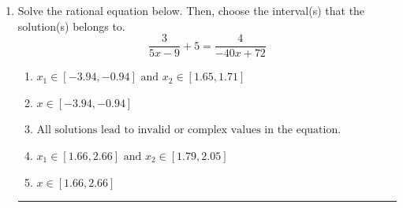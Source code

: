 \documentclass[14pt]{extbook}
\newcommand{\litem}[1]{\item#1\hspace*{-1cm}\rule{\textwidth}{0.4pt}}
\begin{document}
\begin{enumerate}
{\begin{enumerate}[label=\Alph*.]
\end{enumerate} }
\litem{
Solve the rational equation below. Then, choose the interval(s) that the solution(s) belongs to.\[ \frac{3}{5x -9} + 5 = \frac{4}{-40x + 72} \]\begin{enumerate}[label=\Alph*.]
\item \( x_1 \in [-3.94, -0.94] \text{ and } x_2 \in [1.65,1.71] \)
\item \( x \in [-3.94,-0.94] \)
\item \( \text{All solutions lead to invalid or complex values in the equation.} \)
\item \( x_1 \in [1.66, 2.66] \text{ and } x_2 \in [1.79,2.05] \)
\item \( x \in [1.66,2.66] \)

\end{enumerate} }
\end{enumerate}
\end{document}
